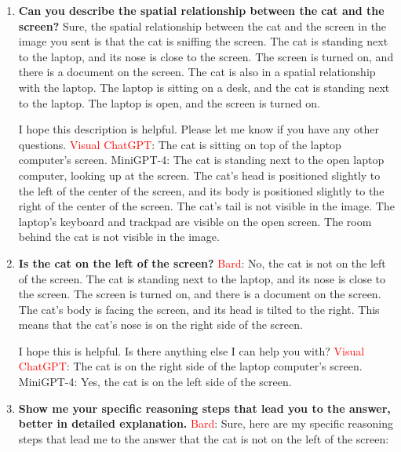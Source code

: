     \begin{enumerate}
        \item \textbf{Can you describe the spatial relationship between the cat and the screen?}
        \subitem 
        Sure, the spatial relationship between the cat and the screen in the image you sent is that the cat is sniffing the screen. The cat is standing next to the laptop, and its nose is close to the screen. The screen is turned on, and there is a document on the screen.
        The cat is also in a spatial relationship with the laptop. The laptop is sitting on a desk, and the cat is standing next to the laptop. The laptop is open, and the screen is turned on.

        I hope this description is helpful. Please let me know if you have any other questions.
        \subitem \textcolor{red}{Visual ChatGPT}: The cat is sitting on top of the laptop computer's screen.
        \subitem MiniGPT-4: The cat is standing next to the open laptop computer, looking up at the screen. The cat’s head is positioned slightly to the left of the center of the screen, and its body is positioned slightly to the right of the center of the screen. The cat’s tail is not visible in the image. The laptop’s keyboard and trackpad are visible on the open screen. The room behind the cat is not visible in the image.
        \item \textbf{Is the cat on the left of the screen?}
        \subitem \textcolor{Red}{Bard}: 
        No, the cat is not on the left of the screen. The cat is standing next to the laptop, and its nose is close to the screen. The screen is turned on, and there is a document on the screen. The cat's body is facing the screen, and its head is tilted to the right. This means that the cat's nose is on the right side of the screen.
        
        I hope this is helpful. Is there anything else I can help you with?
        \subitem \textcolor{red}{Visual ChatGPT}: The cat is on the right side of the laptop computer's screen.
        \subitem MiniGPT-4: Yes, the cat is on the left side of the screen.
        \item \textbf{Show me your specific reasoning steps that lead you to the answer, better in detailed explanation.}
        \subitem \textcolor{Red}{Bard}:
        Sure, here are my specific reasoning steps that lead me to the answer that the cat is not on the left of the screen:
        

\end{enumerate}
